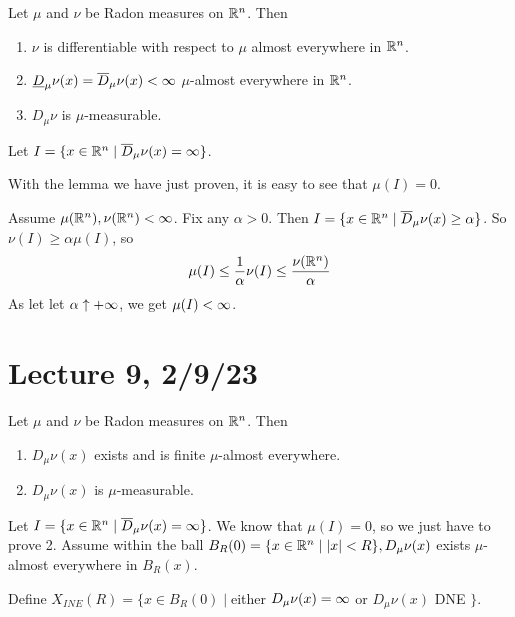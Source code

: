 \documentclass[x11names,reqno,14pt]{extarticle}
\begin{document}
\thm Let $\mu$ and $\nu$ be Radon measures on $\mathbb{R}^n$. Then

\begin{enumerate}[label=(\roman*)]

\item $\nu$ is differentiable with respect to $\mu$ almost everywhere in $\mathbb{R}^n$. 

\item $\underline{D}_\mu\nu(x) = \overline{D}_\mu\nu(x)<\infty$ $\mu$-almost everywhere in $\mathbb{R}^n$. 

\item $D_\mu\nu$ is $\mu$-measurable. 

\end{enumerate}

\proof

Let $I = \{x\in\mathbb{R}^n \mid \overline{D}_\mu\nu(x) = \infty\}$. 

With the lemma we have just proven, it is easy to see that $\mu(I) = 0$. 

Assume $\mu(\mathbb{R}^n),\nu(\mathbb{R}^n) < \infty$. Fix any $\alpha>0$. Then $I = \{x\in\mathbb{R}^n\mid\overline{D}_\mu\nu(x)\geq\alpha\}$. So $\nu(I)\geq\alpha\mu(I)$, so
\[
\mu(I)\leq\frac{1}{\alpha}\nu(I)\leq\frac{\nu(\mathbb{R}^n)}{\alpha}
\]
As let let $\alpha\uparrow+\infty$, we get $\mu(I)<\infty$. 

\section*{Lecture 9, 2/9/23}

\thm

Let $\mu$ and $\nu$ be Radon measures on $\mathbb{R}^n$. Then 

\begin{enumerate}

\item $D_\mu\nu(x)$ exists and is finite $\mu$-almost everywhere. 

\item $D_\mu\nu(x)$ is $\mu$-measurable. 

\end{enumerate}

\proof

Let $I = \{x \in \mathbb{R}^n \mid \overline{D}_\mu\nu(x) = \infty\}$. We know that $\mu(I) = 0$, so we just have to prove 2. Assume within the ball $B_R(0) = \{x\in\mathbb{R}^n\mid|x|<R\}, D_\mu\nu(x)$ exists $\mu$-almost everywhere in $B_R(x)$. 

Define $X_{INE}(R) = \{x\in B_R(0)\mid $either $D_\mu\nu(x) = \infty$ or $D_\mu\nu(x) $ DNE $\}$. 
\end{document}
